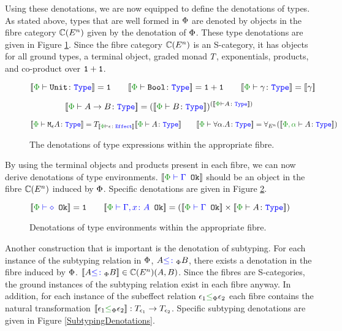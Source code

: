 Using these denotations, we are now equipped to define the denotations of types. As stated above, types that are well formed in $\P$ are denoted by objects in the fibre category $\C(E^n)$ given by the denotation of $\P$. These type denotations are given in Figure \ref{TypeDenotations}. Since the fibre category $\C(E^n)$ is an S-category, it has objects for all ground types, a terminal object, graded monad $\T{}{}$, exponentials, products, and co-product over $\1+\1$.

\begin{figure}[H]
    \centering
    \begin{framed}
\[
    \deno{\typerelation{\P}{\U}{\type}} = \1
    \quad\quad
    \deno{\typerelation{\P}{\B}{\type}} = \1+\1
    \quad\quad
    \deno{\typerelation{\P}{\g}{\type}} = \deno{\g}
\] 

\[
    \deno{\typerelation{\P}{\ab}{\type}} = (\deno{\typerelation{\P}{B}{\type}})^{(\deno{\typerelation{\P}{A}{\type}})}
\]

\[
    \deno{\typerelation{\P}{\mea}{\type}} =\T{\deno{\typerelation{\P}{\e}{\effect}}}{\deno{\typerelation{\P}{A}{\type}}}
    \quad\quad
    \deno{\typerelation{\P}{\all{\a}{A}}{\type}} =\allEn(\deno{\typerelation{\P,\a}{A}{\type}})
\]


    \end{framed}
    \caption{The denotations of type expressions within the appropriate fibre.}
    \label{TypeDenotations}
\end{figure}

By using the terminal objects and products present in each fibre, we can now derive denotations of type environments. $\deno{\oke{\P}{\G}}$ should be an object in the fibre $\C(E^n)$ induced by $\P$. Specific denotations are given in Figure \ref{TypeEnvDenotations}.

\begin{figure}[H]
    \centering
    \begin{framed}
        \[
            \deno{\wellformedok{\P}{\nil}} = \1
            \quad\quad
            \deno{\wellformedok{\P}{\gax}} = (\deno{\wellformedok{\P}{\G}} \times \deno{\typerelation{\P}{A}{\type}})
        \]  
    \end{framed}

    \caption{Denotations of type environments within the appropriate fibre.}
    \label{TypeEnvDenotations}
\end{figure}


Another construction that is important is the denotation of subtyping. For each instance of the subtyping relation in $\P$, $A\subtypep B$, there exists a denotation in the fibre induced by $\P$. $\deno{A\subtypep B} \in\C(E^n)(A, B)$. Since the fibres are S-categories, the ground instances of the subtyping relation exist in each fibre anyway. In addition, for each instance of the subeffect relation $\e_1\subeffectp \e_2$ each fibre contains the natural transformation $\dsep{\e_1}{\e_2}: \T{\e_1}{}\rightarrow \T{\e_2}{}$. Specific subtyping denotations are given in Figure \ref{SubtypingDenotations}.

